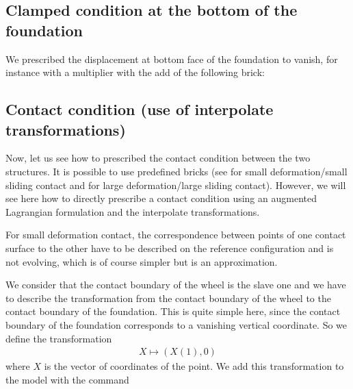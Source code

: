\documentclass[a4paper,11pt,english]{sphinxmanual}
\begin{document}
\subsection{Clamped condition at the bottom of the foundation}
\label{\detokenize{tutorial/wheel:clamped-condition-at-the-bottom-of-the-foundation}}
We prescribed the displacement at  bottom face of the foundation to vanish, for instance with a multiplier with the add of the following brick:

\begin{sphinxVerbatim}[commandchars=\\\{\}]
   
\end{sphinxVerbatim}


\subsection{Contact condition (use of interpolate transformations)}
\label{\detokenize{tutorial/wheel:contact-condition-use-of-interpolate-transformations}}
Now, let us see how to prescribed the contact condition between the two structures. It is possible to use predefined bricks (see   for small deformation/small sliding contact and  for large deformation/large sliding contact). However, we will see here how to directly prescribe a contact condition using an augmented Lagrangian formulation and the interpolate transformations.

For small deformation contact, the correspondence between points of one contact surface to the other have to be described on the reference configuration and is not evolving, which is of course simpler but is an approximation.

We consider that the contact boundary of the wheel is the slave one and we have to describe the transformation from the contact boundary of the wheel to the contact boundary of the foundation. This is quite simple here, since the contact boundary of the foundation corresponds to a vanishing vertical coordinate. So we define the transformation
\begin{equation*}
\begin{split}X \longmapsto (X(1), 0)\end{split}
\end{equation*}
where \(X\) is the vector of coordinates of the point. We add this transformation to the model with the command
\end{document}
